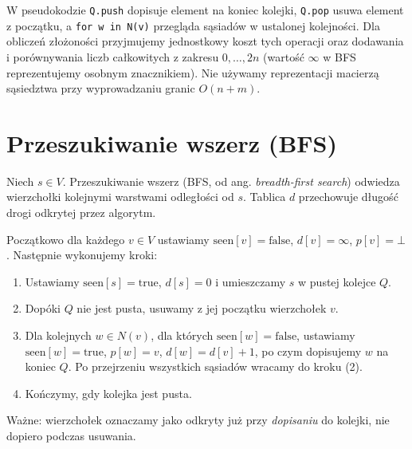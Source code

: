W pseudokodzie \texttt{Q.push} dopisuje element na koniec kolejki,
\texttt{Q.pop} usuwa element z początku,
a \texttt{for w in N(v)} przegląda sąsiadów w ustalonej kolejności.
Dla obliczeń złożoności przyjmujemy jednostkowy koszt tych operacji
oraz dodawania i porównywania liczb całkowitych z zakresu $0,\ldots,2n$ (wartość $\infty$ w BFS reprezentujemy osobnym znacznikiem).
Nie używamy reprezentacji macierzą sąsiedztwa przy wyprowadzaniu
granic $O(n+m)$.

\section{Przeszukiwanie wszerz (BFS)}
\label{sec:tg-algo-bfs}

Niech $s\in V$. Przeszukiwanie wszerz (BFS, od ang.
\emph{breadth-first search}) odwiedza wierzchołki kolejnymi
warstwami odległości od $s$.
Tablica $d$ przechowuje długość drogi odkrytej przez algorytm.

\begin{definicja}
\label{def:tg-algo-bfs}
Początkowo dla każdego $v\in V$ ustawiamy
$\mathrm{seen}[v]=\mathrm{false}$, $d[v]=\infty$,
$p[v]=\bot$. Następnie wykonujemy kroki:
\begin{enumerate}[label=(\arabic*)]
\item Ustawiamy $\mathrm{seen}[s]=\mathrm{true}$, $d[s]=0$
      i umieszczamy $s$ w pustej kolejce $Q$.
\item Dopóki $Q$ nie jest pusta, usuwamy z jej początku
      wierzchołek $v$.
\item Dla kolejnych $w\in N(v)$, dla których
      $\mathrm{seen}[w]=\mathrm{false}$, ustawiamy
      $\mathrm{seen}[w]=\mathrm{true}$, $p[w]=v$,
      $d[w]=d[v]+1$, po czym dopisujemy $w$ na koniec $Q$.
      Po przejrzeniu wszystkich sąsiadów wracamy do kroku (2).
\item Kończymy, gdy kolejka jest pusta.
\end{enumerate}
Ważne: wierzchołek oznaczamy jako odkryty już przy
\emph{dopisaniu} do kolejki, nie dopiero podczas usuwania.
\end{definicja}

